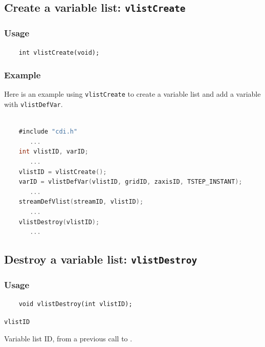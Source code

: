 

\subsection{Create a variable list: \texttt{vlistCreate}}
\label{vlistCreate}
\subsubsection*{Usage}

\begin{verbatim}
    int vlistCreate(void);
\end{verbatim}

\subsubsection*{Example}

Here is an example using {\texttt{vlistCreate}} to create a variable list
and add a variable with {\texttt{vlistDefVar}}.

\begin{lstlisting}[language=C, backgroundcolor=\color{pyellow}, basicstyle=\small, columns=flexible]

    #include "cdi.h"
       ...
    int vlistID, varID;
       ...
    vlistID = vlistCreate();
    varID = vlistDefVar(vlistID, gridID, zaxisID, TSTEP_INSTANT);
       ...
    streamDefVlist(streamID, vlistID);
       ...
    vlistDestroy(vlistID);
       ...
\end{lstlisting}


\subsection{Destroy a variable list: \texttt{vlistDestroy}}
\label{vlistDestroy}
\subsubsection*{Usage}

\begin{verbatim}
    void vlistDestroy(int vlistID);
\end{verbatim}

\hspace*{4mm}\begin{minipage}[]{15cm}
\begin{deflist}{\texttt{vlistID}\ }
\item[\texttt{vlistID}]
Variable list ID, from a previous call to {}.

\end{deflist}
\end{minipage}



